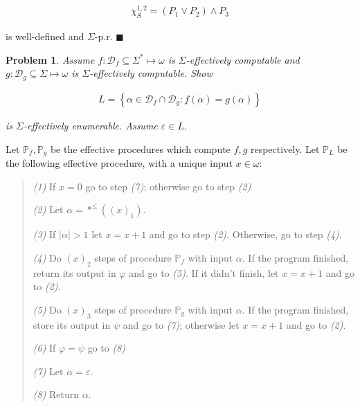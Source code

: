 \documentclass[a4paper, 12pt]{article}
\newtheorem{problem}{Problem}
\newtheorem{problem}{Problem}
\begin{document}
\begin{align*}
    \chi_S^{1, 2} = (P_1 \lor P_2) \land P_3
\end{align*}

is well-defined and $\Sigma$-p.r. $\blacksquare$

\pagebreak 

\begin{problem}
    Assume $f : \mathcal{D}_f \subseteq \Sigma^{*} \mapsto \omega$ is
    $\Sigma$-effectively computable and $g : \mathcal{D}_g \subseteq \Sigma
    \mapsto \omega$ is $\Sigma$-effectively computable. Show 

    \begin{align*}
        L = \left\{ \alpha \in \mathcal{D}_f \cap \mathcal{D}_g : f(\alpha) =
        g(\alpha) \right\} 
    \end{align*}

    is $\Sigma$-effectively enumerable. Assume $\varepsilon \in L$.
\end{problem}

Let $\mathbb{P}_f, \mathbb{P}_g$ be the effective procedures which compute $f,
g$ respectively. Let $\mathbb{P}_L$ be the following effective procedure, with a
unique input $x \in \omega$:

\begin{quote}
    \textit{(1)} If $x = 0$ go to step \textit{(7)}; otherwise go to step
    \textit{(2)}

    \textit{(2)} Let $\alpha = *^{\leq}\left( (x)_1 \right) $. 

    \textit{(3)} If $|\alpha| > 1$ let $x = x + 1$ and go to step \textit{(2)}.
    Otherwise, go to step \textit{(4)}. 

    \textit{(4)} Do $(x)_2$ steps of procedure $\mathbb{P}_f$ with input
    $\alpha$. If the program finished, return its output in $\varphi$ and go to
    \textit{(5)}. If it didn't finish, let $x = x + 1$ and go to \textit{(2)}.

    \textit{(5)} Do $(x)_3$ steps of procedure $\mathbb{P}_g$ with input
    $\alpha$. If the program finished, store its output in $\psi$ and go to
    \textit{(7)}; otherwise let
    $x = x + 1$ and go to \textit{(2)}.

    \textit{(6)} If $\varphi = \psi$ go to \textit{(8)}

    \textit{(7)} Let $\alpha = \varepsilon$. 

    \textit{(8)} Return $\alpha$.

\end{quote}
\end{document}
